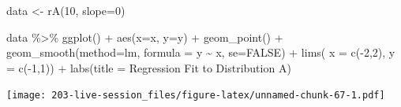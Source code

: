 \documentclass[
]{book}
\newenvironment{Shaded}{\begin{snugshade}}{\end{snugshade}}
\newcommand{\AttributeTok}[1]{\textcolor[rgb]{0.77,0.63,0.00}{#1}}
\newcommand{\ConstantTok}[1]{\textcolor[rgb]{0.00,0.00,0.00}{#1}}
\newcommand{\DecValTok}[1]{\textcolor[rgb]{0.00,0.00,0.81}{#1}}
\newcommand{\FunctionTok}[1]{\textcolor[rgb]{0.00,0.00,0.00}{#1}}
\newcommand{\NormalTok}[1]{#1}
\newcommand{\OtherTok}[1]{\textcolor[rgb]{0.56,0.35,0.01}{#1}}
\newcommand{\SpecialCharTok}[1]{\textcolor[rgb]{0.00,0.00,0.00}{#1}}
\newcommand{\StringTok}[1]{\textcolor[rgb]{0.31,0.60,0.02}{#1}}
\theoremstyle{definition}
\theoremstyle{definition}
\theoremstyle{definition}
\theoremstyle{definition}
\theoremstyle{remark}
\begin{document}
\begin{Shaded}
\begin{Highlighting}[]
\NormalTok{data }\OtherTok{\textless{}{-}}  \FunctionTok{rA}\NormalTok{(}\DecValTok{10}\NormalTok{, }\AttributeTok{slope=}\DecValTok{0}\NormalTok{)}

\NormalTok{data }\SpecialCharTok{\%\textgreater{}\%} 
  \FunctionTok{ggplot}\NormalTok{() }\SpecialCharTok{+} 
  \FunctionTok{aes}\NormalTok{(}\AttributeTok{x=}\NormalTok{x, }\AttributeTok{y=}\NormalTok{y) }\SpecialCharTok{+} 
  \FunctionTok{geom\_point}\NormalTok{() }\SpecialCharTok{+} 
  \FunctionTok{geom\_smooth}\NormalTok{(}\AttributeTok{method=}\StringTok{\textquotesingle{}lm\textquotesingle{}}\NormalTok{, }\AttributeTok{formula =} \StringTok{\textquotesingle{}y \textasciitilde{} x\textquotesingle{}}\NormalTok{, }\AttributeTok{se=}\ConstantTok{FALSE}\NormalTok{) }\SpecialCharTok{+} 
  \FunctionTok{lims}\NormalTok{(}
    \AttributeTok{x =} \FunctionTok{c}\NormalTok{(}\SpecialCharTok{{-}}\DecValTok{2}\NormalTok{,}\DecValTok{2}\NormalTok{), }
    \AttributeTok{y =} \FunctionTok{c}\NormalTok{(}\SpecialCharTok{{-}}\DecValTok{1}\NormalTok{,}\DecValTok{1}\NormalTok{)) }\SpecialCharTok{+} 
  \FunctionTok{labs}\NormalTok{(}\AttributeTok{title =} \StringTok{\textquotesingle{}Regression Fit to Distribution A\textquotesingle{}}\NormalTok{)}
\end{Highlighting}
\end{Shaded}

\texttt{[image: 203-live-session\_files/figure-latex/unnamed-chunk-67-1.pdf]}
\end{document}
